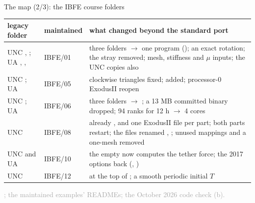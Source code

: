 \documentclass[aspectratio=169,11pt]{beamer}
\newcommand{\sourcecredit}[1]{\vfill\begin{flushright}\tiny\textcolor{DarkGray}{#1}\end{flushright}}
\begin{document}
\begin{frame}{The map (2/3): the IBFE course folders}
\label{fr:map2}
\tiny
\renewcommand{\arraystretch}{1.0}
\setlength{\tabcolsep}{4pt}
\begin{tabular}{@{}L{0.35\textwidth}L{0.12\textwidth}L{0.47\textwidth}@{}}
\toprule
legacy folder & maintained & what changed beyond the standard port \\
\midrule
UNC , ; UA , ,  & IBFE/01 & three folders $\to$ one program (); an exact rotation; the stray \code{\textbackslash\textbackslash} removed; mesh, stiffness and $\mu$ inputs; the UNC copies also  \\
UNC ; UA  & IBFE/05 & clockwise triangles fixed;  added; processor-0 ExodusII reopen \\
UNC ; UA  & IBFE/06 & three folders $\to$ ; a 13 MB committed binary dropped; 94 ranks for 12 h $\to$ 4 cores \\
UNC  & IBFE/08 & already ,  and one ExodusII file per part; both parts restart; the files renamed , ; unused mappings and a one-mesh  removed \\
UNC and UA  & IBFE/10 & the empty  now computes the tether force; the 2017 options back (, ) \\
UNC  & IBFE/12 &  at the top of ; a smooth periodic initial $T$ \\
\bottomrule
\end{tabular}
\sourcecredit{; the maintained examples' READMEs; the October 2026 code check (b).}
\end{frame}
\end{document}
